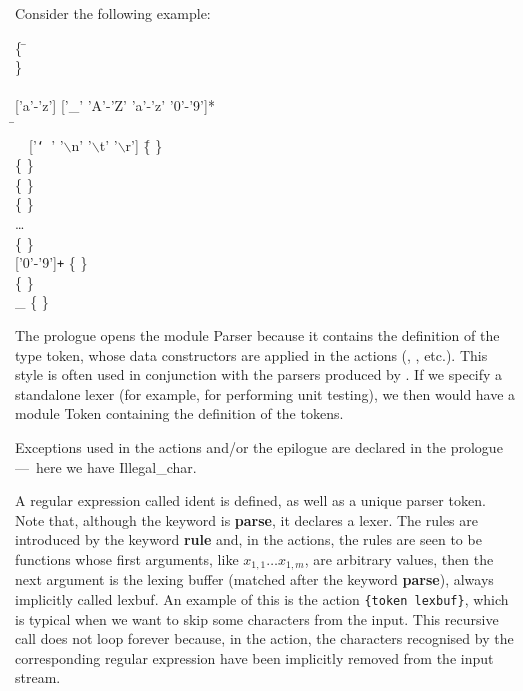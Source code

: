 \documentclass[12pt,a4paper]{article}
\begin{document}
Consider the following example:
\begin{tabbing}
\{ \= \Xopen {}\\
   \> \Xexception {} \Xof {} \}\\
\\
\Xlet {} \equal \textsf{['a'-'z'] ['\_' 'A'-'Z' 'a'-'z' '0'-'9']*}\\
\Xrule \=  \equal \Xparse\\
  \> \ \ \textsf{['{\tt\char`\ }' '\(\backslash\)n' '\(\backslash\)t'
   '\(\backslash\)r']} \= \{   \}\\
  \> \vbar{}  \> \{ \Tlet \}\\
  \> \vbar{}  \> \{ \Trec \}\\
  \> \vbar{} \str{=}   \> \{ \Tequal \}\\
  \> \ldots \\
  \> \vbar{}  \Xas {} \> \{ \Tident {} \}\\
  \> \vbar{} \textsf{['0'-'9']\texttt{+}} \Xas {} \> \{ \Tint
     \lpar{} \rpar{} \}\\
  \> \vbar{}  \> \{ \Teof \}\\
  \> \vbar{} {\large \_} \Xas {} \> \{ 
     \lpar{}  \rpar{} \}
\end{tabbing}
The prologue opens the module \textsf{Parser} because it contains the
definition of the type \textsf{token}, whose data constructors are
applied in the actions (, , etc.). This style is
often used in conjunction with the parsers produced by \menhir. If we
specify a standalone lexer (for example, for performing unit testing),
we then would have a module \textsf{Token} containing the definition
of the tokens.

Exceptions used in the actions and/or the epilogue are declared in the
prologue ---~here we have \textsf{Illegal\_char}.

A regular expression called \textsf{ident} is defined, as well as a
unique parser \textsf{token}. Note that, although the \ocamllex
keyword is \textbf{\textsf{parse}}, it declares a lexer. The rules are
introduced by the keyword \textbf{\textsf{rule}} and, in the actions,
the rules are seen to be functions whose first arguments, like
\(x_{1,1} \dots x_{1,m}\), are arbitrary \OCaml values, then the next
argument is the lexing buffer (matched after the keyword
\textbf{\textsf{parse}}), always implicitly called \textsf{lexbuf}. An
example of this is the action \texttt{\{token lexbuf\}}, which is
typical when we want to skip some characters from the input. This
recursive call does not loop forever because, in the action, the
characters recognised by the corresponding regular expression have
been implicitly removed from the input stream.
\end{document}
